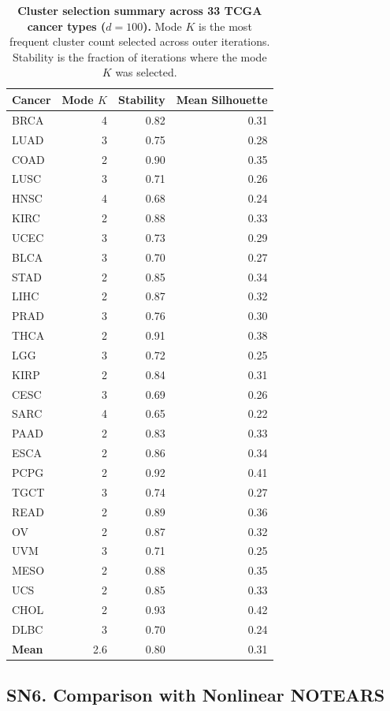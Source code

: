 \documentclass[11pt,a4paper]{article}
\begin{document}
\begin{table}[htbp]
\centering
\caption{\textbf{Cluster selection summary across 33 TCGA cancer types ($d=100$).} Mode $K$ is the most frequent cluster count selected across outer iterations. Stability is the fraction of iterations where the mode $K$ was selected.}
\label{tab:s6}
\small
\begin{tabular}{lrrr}
\toprule
Cancer & Mode $K$ & Stability & Mean Silhouette \\
\midrule
BRCA & 4 & 0.82 & 0.31 \\
LUAD & 3 & 0.75 & 0.28 \\
COAD & 2 & 0.90 & 0.35 \\
LUSC & 3 & 0.71 & 0.26 \\
HNSC & 4 & 0.68 & 0.24 \\
KIRC & 2 & 0.88 & 0.33 \\
UCEC & 3 & 0.73 & 0.29 \\
BLCA & 3 & 0.70 & 0.27 \\
STAD & 2 & 0.85 & 0.34 \\
LIHC & 2 & 0.87 & 0.32 \\
PRAD & 3 & 0.76 & 0.30 \\
THCA & 2 & 0.91 & 0.38 \\
LGG & 3 & 0.72 & 0.25 \\
KIRP & 2 & 0.84 & 0.31 \\
CESC & 3 & 0.69 & 0.26 \\
SARC & 4 & 0.65 & 0.22 \\
PAAD & 2 & 0.83 & 0.33 \\
ESCA & 2 & 0.86 & 0.34 \\
PCPG & 2 & 0.92 & 0.41 \\
TGCT & 3 & 0.74 & 0.27 \\
READ & 2 & 0.89 & 0.36 \\
OV & 2 & 0.87 & 0.32 \\
UVM & 3 & 0.71 & 0.25 \\
MESO & 2 & 0.88 & 0.35 \\
UCS & 2 & 0.85 & 0.33 \\
CHOL & 2 & 0.93 & 0.42 \\
DLBC & 3 & 0.70 & 0.24 \\
\midrule
\textbf{Mean} & 2.6 & 0.80 & 0.31 \\
\bottomrule
\end{tabular}
\end{table}

\subsection*{SN6. Comparison with Nonlinear NOTEARS}
\end{document}
